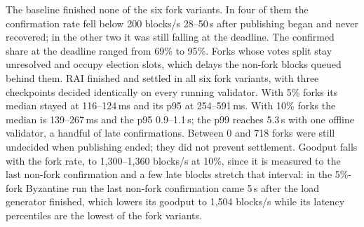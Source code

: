 The baseline finished none of the six fork variants. In four of them the confirmation rate fell below 200 blocks/s 28--50\,s after publishing began and never recovered; in the other two it was still falling at the deadline. The confirmed share at the deadline ranged from 69\% to 95\%. Forks whose votes split stay unresolved and occupy election slots, which delays the non-fork blocks queued behind them. RAI finished and settled in all six fork variants, with three checkpoints decided identically on every running validator. With 5\% forks its median stayed at 116--124\,ms and its p95 at 254--591\,ms. With 10\% forks the median is 139--267\,ms and the p95 0.9--1.1\,s; the p99 reaches 5.3\,s with one offline validator, a handful of late confirmations. Between 0 and 718 forks were still undecided when publishing ended; they did not prevent settlement. Goodput falls with the fork rate, to 1{,}300--1{,}360 blocks/s at 10\%, since it is measured to the last non-fork confirmation and a few late blocks stretch that interval: in the 5\%-fork Byzantine run the last non-fork confirmation came 5\,s after the load generator finished, which lowers its goodput to 1{,}504 blocks/s while its latency percentiles are the lowest of the fork variants.

